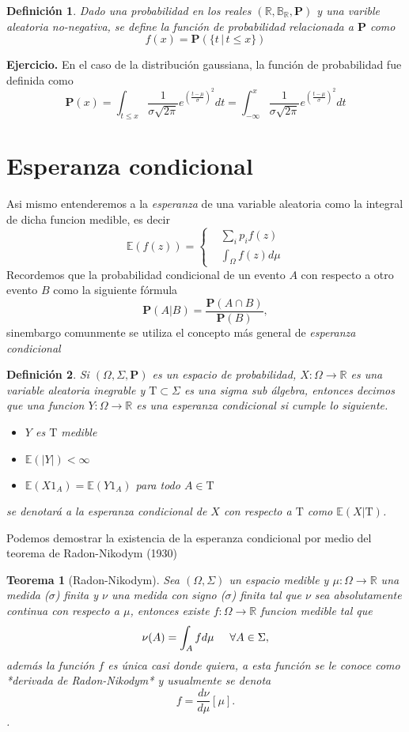 \documentclass[letterpaper]{book}
\newtheorem{teorema}{Teorema}[section]
\newtheorem{def.}{Definici\'on}[section]
\newcommand{\prob}{\textbf{P}}
\newcommand{\esp}{\mathbb E}
\newcommand{\eje}{{\newline \noindent \sc \textbf{Ejercicio. }}}
\newcommand{\dem}{{\noindent \sc Demostraci\'on. }}
\newcommand{\re}{\ensuremath{\mathbb R }}
\begin{document}
\begin{def.}
Dado una probabilidad en los reales \((\re,\mathbb{B}_{\re},\prob)\) y una varible aleatoria no-negativa, se define la \emph{función de probabilidad} relacionada a \(\prob\) como
\[
        f(x)=\prob(\{t\,|\,t\leq x\})
\]
\end{def.}
\eje En el caso de la distribución gaussiana, la función de probabilidad fue definida como
\[
    \prob(x)=\int_{t\leq x}\frac{1}{\sigma\sqrt{2\pi}}e^{(\frac{t-\mu}{\sigma})^2}dt =
    \int_{-\infty}^{x}\frac{1}{\sigma\sqrt{2\pi}}e^{(\frac{t-\mu}{\sigma})^2}dt
\]

\section{Esperanza condicional}
\label{sec:orgb04b580}
\noindent Asi mismo entenderemos a la \emph{esperanza} de una variable aleatoria como la integral de dicha funcion medible, es decir
\begin{equation}
    \esp(f(z))=
    \begin{cases}
        & \sum_{i} p_i f(z)\\
        & \int_{\Omega}f(z)d\mu
    \end{cases}
\end{equation}
Recordemos que la probabilidad condicional de un evento \(A\) con respecto a otro evento \(B\) como la siguiente fórmula
\[
    \prob(A|B)=\frac{\prob(A\cap B)}{\prob(B)},
\]
\noindent sinembargo comunmente se utiliza el concepto más general de \emph{esperanza condicional}
\begin{def.}
    Si \((\Omega,\Sigma,\prob)\) es un espacio de probabilidad, \(X:\Omega\rightarrow\re\) es una variable aleatoria inegrable y \(\mathrm{T} \subset\Sigma\) es una sigma sub álgebra, entonces decimos que una funcion \(Y:\Omega\rightarrow\re\) es una \emph{esperanza} condicional si cumple lo siguiente.
\begin{itemize}
\item \(Y\) es \(\mathrm{T}\) medible
\item \(\esp(|Y|)<\infty\)
\item \(\esp(X 1_A)=\esp(Y1_A)\) para todo \(A\in\mathrm{T}\)
\end{itemize}
se denotará a la esperanza condicional de \(X\) con respecto a \(\mathrm{T}\) como \(\esp(X|\mathrm{T})\).
\end{def.}
\noindent\dem Podemos demostrar la existencia de la esperanza condicional por medio del teorema de Radon-Nikodym (1930)
\begin{teorema}[Radon-Nikodym]
    Sea $(\Omega,\Sigma)$ un espacio medible y $\mu:\Omega\rightarrow\re$ una medida ($\sigma$) finita y $\nu$ una medida con signo ($\sigma$) finita tal que $\nu$ sea absolutamente continua con respecto a $\mu$, entonces existe $f:\Omega\rightarrow\re$ funcion medible tal que
\begin{equation}
    \nu(A)=\int_{A} f d\mu \hspace{0.5cm}\forall A\in\Sigma,
\end{equation}
además la función $f$ es única casi donde quiera, a esta función se le conoce como *derivada de Radon-Nikodym* y usualmente se denota
\[
    f=\frac{d\nu}{d\mu}[\mu].
\].
\end{teorema}
\end{document}
